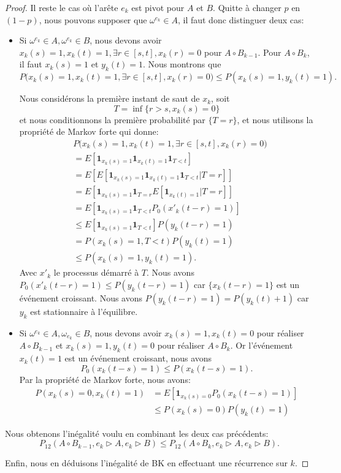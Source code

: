 \documentclass[titlepage,a4paper,12pt]{article}
\newcounter{prop}
\begin{document}
\begin{proof}
Il reste le cas où l'arête $e_k$ est pivot pour $A$ et $B$. Quitte à changer $p$ en $(1-p)$, nous pouvons supposer que $\omega^{e_k}\in A$, il faut donc distinguer deux cas:
\begin{itemize}[label = $\bullet$, leftmargin = *]
\item Si $\omega^{e_k}\in A, \omega^{e_k}\in B$, nous devons avoir $x_k(s) = 1, x_k(t) =1, \exists r\in [s,t], x_k(r) = 0$ pour $A\circ B_{k-1}$. Pour $A\circ B_k$, il faut $x_k(s)=1$ et $y_k(t)=1$. Nous montrons que $$P\big(x_k(s) = 1, x_k(t) =1, \exists r\in [s,t], x_k(r) = 0\big)\leqslant P(x_k(s)=1,y_k(t)=1).$$

Nous considérons la première instant de saut de $x_k$, soit 
$$T = \inf\{ r> s, x_k(s) =0 \}
$$
et nous conditionnons la première probabilité par $\{T=r\}$, et nous utilisons la propriété de Markov forte qui donne:
\begin{align*}
&P\big(x_k(s) = 1, x_k(t) =1, \exists r\in [s,t], x_k(r) = 0\big) \\
&= E\left[\mathbf{1}_{x_k(s) = 1}\mathbf{1}_{x_k(t) = 1}\mathbf{1}_{T<t}\right] \\
&= E\left[E[\mathbf{1}_{x_k(s) = 1}\mathbf{1}_{x_k(t) = 1}\mathbf{1}_{T<t}| T=r]\right] \\
&= E\left[\mathbf{1}_{x_k(s) = 1}\mathbf{1}_{T = r}E[\mathbf{1}_{x_k(t) = 1}| T=r]\right] \\
& = E\left[\mathbf{1}_{x_k(s) = 1}\mathbf{1}_{T <t}P_0(x'_k(t-r) =1)\right] \\
& \leqslant E\left[\mathbf{1}_{x_k(s) = 1}\mathbf{1}_{T <t}\right]P(y_k(t-r) =1)\\
& = P(x_k(s) = 1, T< t) P(y_k(t)=1) \\
& \leqslant P(x_k(s)=1, y_k(t) = 1).
\end{align*}
Avec $x'_k$ le processus démarré à $T$. Nous avons $P_0(x'_k(t-r) = 1) \leqslant P(y_k(t-r) = 1)$ car $\{x_k(t-r) = 1\}$ est un événement croissant. Nous avons $P(y_k(t-r)= 1) = P(y_k(t)+1)$ car $y_k$ est stationnaire à l'équilibre.

\item Si $\omega^{e_k}\in A, \omega_{e_k}\in B$, nous devons avoir $x_k(s)=1,x_k(t)=0$ pour réaliser $A\circ B_{k-1}$ et $x_k(s) = 1, y_k(t) = 0$ pour réaliser $A\circ B_k$. Or l'événement $x_k(t) = 1$ est un événement croissant, nous avons $$P_0(x_k(t-s) = 1)\leqslant P(x_k(t-s) =1).$$ Par la propriété de Markov forte, nous avons:
\begin{align*}
P(x_k(s) = 0, x_k(t) = 1) &= E[\mathbf{1}_{x_k(s)=0}P_0(x_k(t-s) = 1)]\\
& \leqslant P(x_k(s) = 0) P(y_k(t) = 1)
\end{align*}
\end{itemize}


Nous obtenons l'inégalité voulu en combinant les deux cas précédents: $$P_{12}(A\circ B_{k-1}, e_k\triangleright A, e_k \triangleright B)\leqslant P_{12}(A\circ B_{k}, e_k\triangleright A, e_k \triangleright B).$$

Enfin, nous en déduisons l'inégalité de BK en effectuant une récurrence sur $k$. 
\end{proof}
\end{document}
